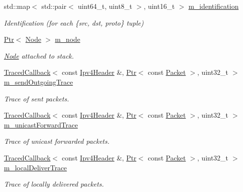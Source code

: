 \begin{DoxyCompactItemize}
std\+::map$<$ std\+::pair$<$ uint64\+\_\+t, uint8\+\_\+t $>$, uint16\+\_\+t $>$ \hyperlink{classns3_1_1Ipv4L3Protocol_a64746ae9a15d32cd8d0b4467d6b66949}{m\+\_\+identification}
\begin{DoxyCompactList}\small\item\em Identification (for each \{src, dst, proto\} tuple) \end{DoxyCompactList}\item 
\hyperlink{classns3_1_1Ptr}{Ptr}$<$ \hyperlink{classns3_1_1Node}{Node} $>$ \hyperlink{classns3_1_1Ipv4L3Protocol_ad2cc5076c247724f1e99b398edc1965a}{m\+\_\+node}
\begin{DoxyCompactList}\small\item\em \hyperlink{classns3_1_1Node}{Node} attached to stack. \end{DoxyCompactList}\item 
\hyperlink{classns3_1_1TracedCallback}{Traced\+Callback}$<$ const \hyperlink{classns3_1_1Ipv4Header}{Ipv4\+Header} \&, \hyperlink{classns3_1_1Ptr}{Ptr}$<$ const \hyperlink{classns3_1_1Packet}{Packet} $>$, uint32\+\_\+t $>$ \hyperlink{classns3_1_1Ipv4L3Protocol_a909297aa7ca87db2b7c91daefa2ed40a}{m\+\_\+send\+Outgoing\+Trace}
\begin{DoxyCompactList}\small\item\em Trace of sent packets. \end{DoxyCompactList}\item 
\hyperlink{classns3_1_1TracedCallback}{Traced\+Callback}$<$ const \hyperlink{classns3_1_1Ipv4Header}{Ipv4\+Header} \&, \hyperlink{classns3_1_1Ptr}{Ptr}$<$ const \hyperlink{classns3_1_1Packet}{Packet} $>$, uint32\+\_\+t $>$ \hyperlink{classns3_1_1Ipv4L3Protocol_acc97efd317fd7e0c1a65c6247fa6537a}{m\+\_\+unicast\+Forward\+Trace}
\begin{DoxyCompactList}\small\item\em Trace of unicast forwarded packets. \end{DoxyCompactList}\item 
\hyperlink{classns3_1_1TracedCallback}{Traced\+Callback}$<$ const \hyperlink{classns3_1_1Ipv4Header}{Ipv4\+Header} \&, \hyperlink{classns3_1_1Ptr}{Ptr}$<$ const \hyperlink{classns3_1_1Packet}{Packet} $>$, uint32\+\_\+t $>$ \hyperlink{classns3_1_1Ipv4L3Protocol_a70adc805da9b70e8fb6f2a998f4df446}{m\+\_\+local\+Deliver\+Trace}
\begin{DoxyCompactList}\small\item\em Trace of locally delivered packets. \end{DoxyCompactList}\item 

\end{DoxyCompactItemize}

